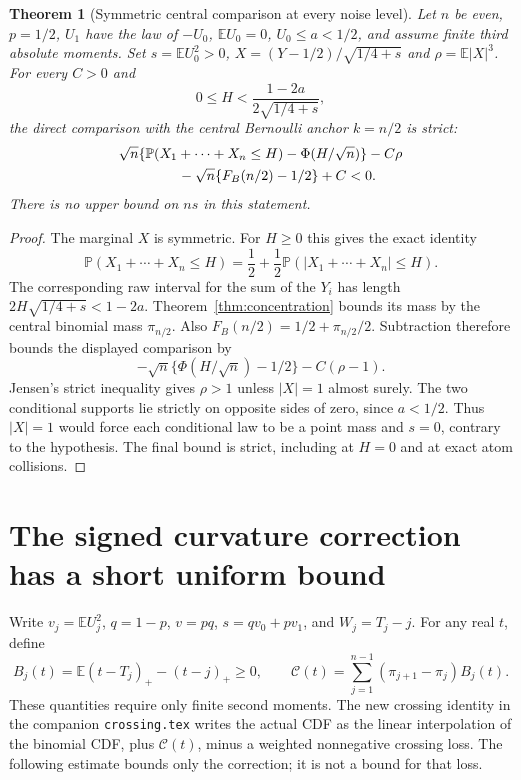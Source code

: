 \documentclass[11pt,a4paper]{article}
\newcommand{\E}{\mathbb E}\newcommand{\Pp}{\mathbb P}
\newtheorem{theorem}{Theorem}\newtheorem{lemma}[theorem]{Lemma}
\begin{document}
\begin{theorem}[Symmetric central comparison at every noise level]
Let $n$ be even, $p=1/2$, $U_1$ have the law of $-U_0$,
$\E U_0=0$, $U_0\le a<1/2$, and assume finite third absolute moments.
Set $s=\E U_0^2>0$, $X=(Y-1/2)/\sqrt{1/4+s}$ and
$\rho=\E|X|^3$. For every $C>0$ and
\[
             0\le H<\frac{1-2a}{2\sqrt{1/4+s}},
\]
the direct comparison with the central Bernoulli anchor $k=n/2$ is strict:
\begin{align*}
 &\sqrt n\{\Pp(X_1+\cdots+X_n\le H)-\Phi(H/\sqrt n)\}-C\rho\\
 &\hspace{15mm}-\sqrt n\{F_B(n/2)-1/2\}+C<0.
\end{align*}
There is no upper bound on $ns$ in this statement.
\end{theorem}
\begin{proof}
The marginal $X$ is symmetric. For $H\ge0$ this gives the exact identity
\[
 \Pp(X_1+\cdots+X_n\le H)
 =\frac12+\frac12\Pp(|X_1+\cdots+X_n|\le H).
\]
The corresponding raw interval for the sum of the $Y_i$ has length
$2H\sqrt{1/4+s}<1-2a$. Theorem~\ref{thm:concentration} bounds its
mass by the central binomial mass $\pi_{n/2}$. Also
$F_B(n/2)=1/2+\pi_{n/2}/2$. Subtraction therefore bounds the displayed
comparison by
\[
       -\sqrt n\{\Phi(H/\sqrt n)-1/2\}-C(\rho-1).
\]
Jensen's strict inequality gives $\rho>1$ unless $|X|=1$ almost surely.
The two conditional supports lie strictly on opposite sides of zero,
since $a<1/2$. Thus $|X|=1$ would force each conditional law to be a
point mass and $s=0$, contrary to the hypothesis. The final bound is strict,
including at $H=0$ and at exact atom collisions.
\end{proof}

\section{The signed curvature correction has a short uniform bound}
Write $v_j=\E U_j^2$, $q=1-p$, $v=pq$, $s=qv_0+pv_1$, and
$W_j=T_j-j$. For any real $t$, define
\[
 B_j(t)=\E(t-T_j)_+-(t-j)_+\ge0,\qquad
 \mathcal C(t)=\sum_{j=1}^{n-1}(\pi_{j+1}-\pi_j)B_j(t).
\]
These quantities require only finite second moments. The new crossing
identity in the companion \texttt{crossing.tex} writes the actual CDF as
the linear interpolation of the binomial CDF, plus $\mathcal C(t)$,
minus a weighted nonnegative crossing loss. The following estimate bounds
only the correction; it is not a bound for that loss.
\end{document}
